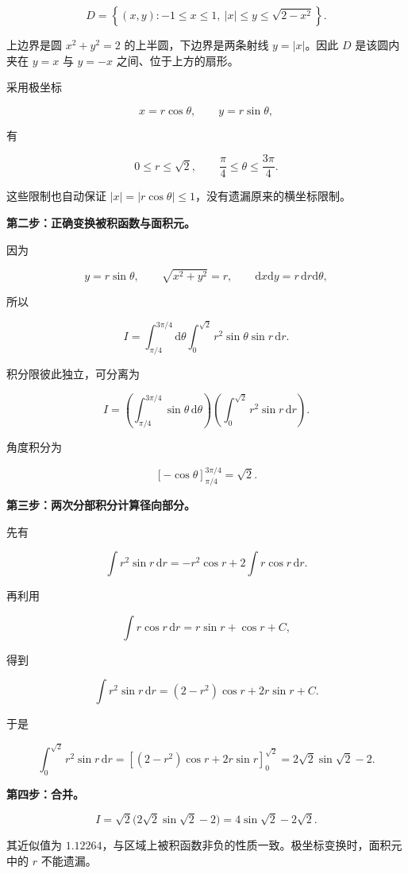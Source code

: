 \documentclass[UTF8,11pt,fontset=windows]{ctexart}
\begin{document}
$$
D=\left\{(x,y):-1\le x\le1,\ |x|\le y\le\sqrt{2-x^2}\right\}.
$$

上边界是圆 $x^2+y^2=2$ 的上半圆，下边界是两条射线 $y=|x|$。因此 $D$ 是该圆内夹在 $y=x$ 与 $y=-x$ 之间、位于上方的扇形。

采用极坐标

$$
x=r\cos\theta,\qquad y=r\sin\theta,
$$

有

$$
0\le r\le\sqrt2,\qquad \frac\pi4\le\theta\le\frac{3\pi}4.
$$

这些限制也自动保证 $|x|=|r\cos\theta|\le1$，没有遗漏原来的横坐标限制。

\textbf{第二步：正确变换被积函数与面积元。}

因为

$$
y=r\sin\theta,\qquad \sqrt{x^2+y^2}=r,
\qquad \mathrm{d}x\mathrm{d}y=r\,\mathrm{d}r\mathrm{d}\theta,
$$

所以

$$
I=\int_{\pi/4}^{3\pi/4}\mathrm{d}\theta
\int_0^{\sqrt2}r^2\sin\theta\sin r\,\mathrm{d}r.
$$

积分限彼此独立，可分离为

$$
I=\left(\int_{\pi/4}^{3\pi/4}\sin\theta\,\mathrm{d}\theta\right)
\left(\int_0^{\sqrt2}r^2\sin r\,\mathrm{d}r\right).
$$

角度积分为

$$
\left[-\cos\theta\right]_{\pi/4}^{3\pi/4}=\sqrt2.
$$

\textbf{第三步：两次分部积分计算径向部分。}

先有

$$
\int r^2\sin r\,\mathrm{d}r
=-r^2\cos r+2\int r\cos r\,\mathrm{d}r.
$$

再利用

$$
\int r\cos r\,\mathrm{d}r=r\sin r+\cos r+C,
$$

得到

$$
\int r^2\sin r\,\mathrm{d}r
=(2-r^2)\cos r+2r\sin r+C.
$$

于是

$$
\int_0^{\sqrt2}r^2\sin r\,\mathrm{d}r
=\left[(2-r^2)\cos r+2r\sin r\right]_0^{\sqrt2}
=2\sqrt2\sin\sqrt2-2.
$$

\textbf{第四步：合并。}

$$
I=\sqrt2\bigl(2\sqrt2\sin\sqrt2-2\bigr)
=\boxed{4\sin\sqrt2-2\sqrt2}.
$$

其近似值为 $1.12264$，与区域上被积函数非负的性质一致。极坐标变换时，面积元中的 $r$ 不能遗漏。
\end{document}
